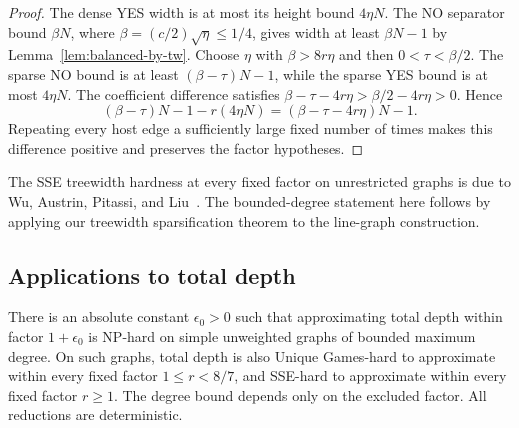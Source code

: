 \begin{proof}
The dense YES width is at most its height bound $4\eta N$.
The NO separator bound $\beta N$, where
$\beta=(c/2)\sqrt\eta\le1/4$, gives width at least $\beta N-1$
by Lemma~\ref{lem:balanced-by-tw}. Choose $\eta$ with
$\beta>8r\eta$ and then $0<\tau<\beta/2$. The sparse NO bound
is at least $(\beta-\tau)N-1$, while the sparse YES bound is at most
$4\eta N$. The coefficient difference satisfies
$\beta-\tau-4r\eta>\beta/2-4r\eta>0$. Hence
\[
 (\beta-\tau)N-1-r(4\eta N)
 =(\beta-\tau-4r\eta)N-1.
\]
Repeating every host edge a sufficiently large fixed number of times
makes this difference positive and preserves the factor hypotheses.
\end{proof}

The \textup{SSE} treewidth hardness at every fixed factor on unrestricted
graphs is due to Wu, Austrin, Pitassi, and Liu~\cite[Theorem~1.1]{APW}. The bounded-degree
statement here follows by applying our treewidth sparsification
theorem to the line-graph construction.

\subsection{Applications to total depth}

\begin{corollary}
\label{cor:total-depth-bounded-degree}
\label{thm:np-total-depth-bounded-degree}
\label{thm:total-depth-ugc-bounded-degree}
\label{cor:total-depth-sse-bounded-degree}
There is an absolute constant $\epsilon_0>0$ such that approximating
total depth within factor $1+\epsilon_0$ is \textup{NP}-hard on simple
unweighted graphs of bounded maximum degree. On such graphs,
total depth is also Unique Games-hard to approximate within every
fixed factor $1\le r<8/7$, and \textup{SSE}-hard to approximate within every
fixed factor $r\ge1$. The degree bound depends only on the excluded
factor. All reductions are deterministic.
\end{corollary}

